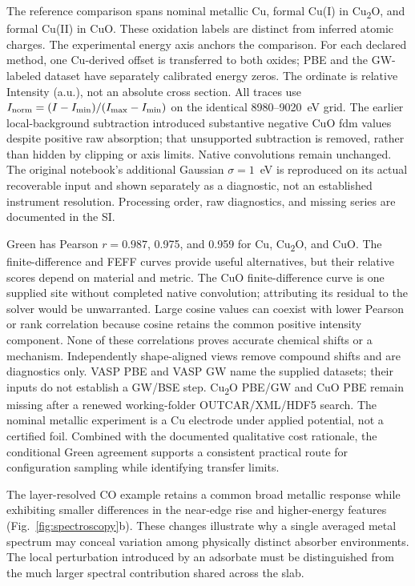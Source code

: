 \documentclass[11pt,a4paper]{article}
\begin{document}
The reference comparison spans nominal metallic Cu, formal Cu(I) in Cu\textsubscript{2}O, and formal Cu(II) in CuO. These oxidation labels are distinct from inferred atomic charges. The experimental energy axis anchors the comparison. For each declared method, one Cu-derived offset is transferred to both oxides; PBE and the GW-labeled dataset have separately calibrated energy zeros. The ordinate is relative Intensity (a.u.), not an absolute cross section. All traces use $I_{\rm norm}=(I-I_{\min})/(I_{\max}-I_{\min})$ on the identical 8980--9020~eV grid. The earlier local-background subtraction introduced substantive negative CuO fdm values despite positive raw absorption; that unsupported subtraction is removed, rather than hidden by clipping or axis limits. Native convolutions remain unchanged. The original notebook's additional Gaussian $\sigma=1$~eV is reproduced on its actual recoverable input and shown separately as a diagnostic, not an established instrument resolution. Processing order, raw diagnostics, and missing series are documented in the SI.



Green has Pearson $r=0.987$, 0.975, and 0.959 for Cu, Cu\textsubscript{2}O, and CuO. The finite-difference and FEFF curves provide useful alternatives, but their relative scores depend on material and metric. The CuO finite-difference curve is one supplied site without completed native convolution; attributing its residual to the solver would be unwarranted. Large cosine values can coexist with lower Pearson or rank correlation because cosine retains the common positive intensity component. None of these correlations proves accurate chemical shifts or a mechanism. Independently shape-aligned views remove compound shifts and are diagnostics only. VASP PBE and VASP GW name the supplied datasets; their inputs do not establish a GW/BSE step. Cu\textsubscript{2}O PBE/GW and CuO PBE remain missing after a renewed working-folder OUTCAR/XML/HDF5 search. The nominal metallic experiment is a Cu electrode under applied potential, not a certified foil. Combined with the documented qualitative cost rationale, the conditional Green agreement supports a consistent practical route for configuration sampling while identifying transfer limits.

The layer-resolved CO example retains a common broad metallic response while exhibiting smaller differences in the near-edge rise and higher-energy features (Fig.~\ref{fig:spectroscopy}b). These changes illustrate why a single averaged metal spectrum may conceal variation among physically distinct absorber environments. The local perturbation introduced by an adsorbate must be distinguished from the much larger spectral contribution shared across the slab.
\end{document}
